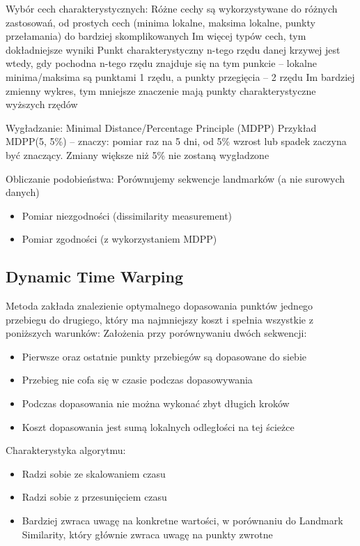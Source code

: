 \par
Wybór cech charakterystycznych:
Różne cechy są wykorzystywane do różnych zastosowań, od prostych cech (minima lokalne, maksima lokalne, punkty przełamania) do bardziej skomplikowanych
Im więcej typów cech, tym dokładniejsze wyniki
Punkt charakterystyczny n-tego rzędu danej krzywej jest wtedy, gdy pochodna n-tego rzędu znajduje się na tym punkcie – lokalne minima/maksima są punktami 1 rzędu, a punkty przegięcia – 2 rzędu
Im bardziej zmienny wykres, tym mniejsze znaczenie mają punkty charakterystyczne wyższych rzędów
\par
Wygładzanie: Minimal Distance/Percentage Principle (MDPP) 
Przykład MDPP(5, 5\%) – znaczy: pomiar raz na 5 dni, od 5\% wzrost lub spadek zaczyna być znaczący. Zmiany większe niż 5\% nie zostaną wygładzone
\par 
Obliczanie podobieństwa: Porównujemy sekwencje landmarków (a nie surowych danych)
\begin{itemize}
    \item Pomiar niezgodności (dissimilarity measurement)
    \item Pomiar zgodności (z wykorzystaniem MDPP)
\end{itemize}

\subsection{Dynamic Time Warping}
Metoda zakłada znalezienie optymalnego dopasowania punktów jednego przebiegu do drugiego, który ma najmniejszy koszt i spełnia wszystkie z poniższych warunków:
Założenia przy porównywaniu dwóch sekwencji:
\begin{itemize}
    \item Pierwsze oraz ostatnie punkty przebiegów są dopasowane do siebie
    \item Przebieg nie cofa się w czasie podczas dopasowywania
    \item Podczas dopasowania nie można wykonać zbyt długich kroków
    \item Koszt dopasowania jest sumą lokalnych odległości na tej ścieżce
\end{itemize}
Charakterystyka algorytmu:
\begin{itemize}
    \item Radzi sobie ze skalowaniem czasu 
    \item Radzi sobie z przesunięciem czasu
    \item Bardziej zwraca uwagę na konkretne wartości, w porównaniu do Landmark Similarity, który głównie zwraca uwagę na punkty zwrotne
\end{itemize}

